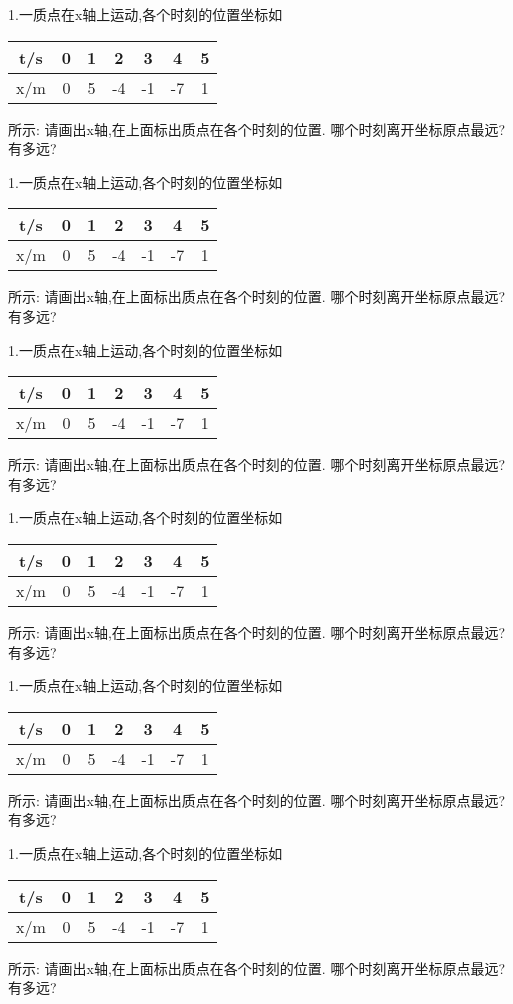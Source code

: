 \documentclass[a4paper,fontset = windowsnew]{ctexbook}
\begin{document}
\begin{jisuan}
  1.一质点在x轴上运动,各个时刻的位置坐标如
   \begin{tabular}{|*{7}{c|}}
      \hline
      t/s & 0 & 1 & 2 & 3 & 4 & 5\\
      \hline
      x/m & 0 & 5 & -4 & -1 & -7 & 1\\
      \hline
   \end{tabular}
   所示:
   \qitem 请画出x轴,在上面标出质点在各个时刻的位置.
   \qitem 哪个时刻离开坐标原点最远?有多远?

  1.一质点在x轴上运动,各个时刻的位置坐标如
   \begin{tabular}{|*{7}{c|}}
      \hline
      t/s & 0 & 1 & 2 & 3 & 4 & 5\\
      \hline
      x/m & 0 & 5 & -4 & -1 & -7 & 1\\
      \hline
   \end{tabular}
   所示:
   \qitem 请画出x轴,在上面标出质点在各个时刻的位置.
   \qitem 哪个时刻离开坐标原点最远?有多远?

  1.一质点在x轴上运动,各个时刻的位置坐标如
   \begin{tabular}{|*{7}{c|}}
      \hline
      t/s & 0 & 1 & 2 & 3 & 4 & 5\\
      \hline
      x/m & 0 & 5 & -4 & -1 & -7 & 1\\
      \hline
   \end{tabular}
   所示:
   \qitem 请画出x轴,在上面标出质点在各个时刻的位置.
   \qitem 哪个时刻离开坐标原点最远?有多远?

  1.一质点在x轴上运动,各个时刻的位置坐标如
   \begin{tabular}{|*{7}{c|}}
      \hline
      t/s & 0 & 1 & 2 & 3 & 4 & 5\\
      \hline
      x/m & 0 & 5 & -4 & -1 & -7 & 1\\
      \hline
   \end{tabular}
   所示:
   \qitem 请画出x轴,在上面标出质点在各个时刻的位置.
   \qitem 哪个时刻离开坐标原点最远?有多远?

  1.一质点在x轴上运动,各个时刻的位置坐标如
   \begin{tabular}{|*{7}{c|}}
      \hline
      t/s & 0 & 1 & 2 & 3 & 4 & 5\\
      \hline
      x/m & 0 & 5 & -4 & -1 & -7 & 1\\
      \hline
   \end{tabular}
   所示:
   \qitem 请画出x轴,在上面标出质点在各个时刻的位置.
   \qitem 哪个时刻离开坐标原点最远?有多远?

  1.一质点在x轴上运动,各个时刻的位置坐标如
   \begin{tabular}{|*{7}{c|}}
      \hline
      t/s & 0 & 1 & 2 & 3 & 4 & 5\\
      \hline
      x/m & 0 & 5 & -4 & -1 & -7 & 1\\
      \hline
   \end{tabular}
   所示:
   \qitem 请画出x轴,在上面标出质点在各个时刻的位置.
   \qitem 哪个时刻离开坐标原点最远?有多远?


\end{jisuan}
\end{document}
